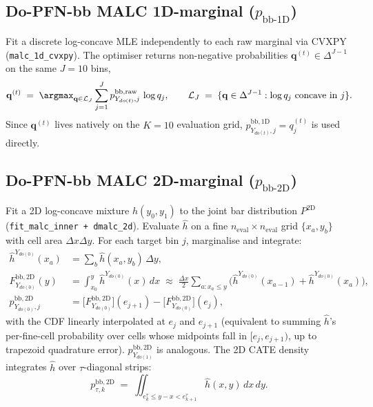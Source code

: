 \subsection{Do-PFN-bb MALC 1D-marginal ($p_{\text{bb-1D}}$)}
\label{app:bb1d}
Fit a discrete log-concave MLE independently to each raw marginal via
CVXPY (\texttt{malc\_1d\_cvxpy}).  The optimiser returns non-negative
probabilities $\mathbf{q}^{(t)} \in \Delta^{J-1}$ on the same $J = 10$
bins,
\[
\mathbf{q}^{(t)} \;=\; \argmax_{\mathbf{q} \in \mathcal{L}_J}
\sum_{j=1}^{J} p^{\mathrm{bb,raw}}_{Y_{do(t)}, j}\, \log q_j,
\qquad
\mathcal{L}_J \;=\; \{\mathbf{q} \in \Delta^{J-1} : \log q_j\ \text{concave in }j\}.
\]
Since $\mathbf{q}^{(t)}$ lives natively on the $K = 10$ evaluation grid,
$p^{\mathrm{bb,1D}}_{Y_{do(t)}, j} = q^{(t)}_j$ is used directly.

\subsection{Do-PFN-bb MALC 2D-marginal ($p_{\text{bb-2D}}$)}
\label{app:bb2d}
Fit a 2D log-concave mixture $\widehat{h}(y_0, y_1)$ to the joint bar
distribution $P^{\mathrm{2D}}$ (\texttt{fit\_malc\_inner + dmalc\_2d}).
Evaluate $\widehat{h}$ on a fine $n_{\text{eval}} \times n_{\text{eval}}$
grid $\{x_a, y_b\}$ with cell area $\Delta x \Delta y$.  For each target
bin $j$, marginalise and integrate:
\begin{align}
\widehat{h}^{Y_{do(0)}}(x_a) &= \sum_b \widehat{h}(x_a, y_b)\, \Delta y, \\
\label{eq:bb2d-cdf}
F^{\mathrm{bb,2D}}_{Y_{do(0)}}(y) &= \int_{x_0}^{y} \widehat{h}^{Y_{do(0)}}(x)\, dx
   \;\approx\; \frac{\Delta x}{2}\sum_{a: x_a \le y}
       \bigl(\widehat{h}^{Y_{do(0)}}(x_{a-1}) + \widehat{h}^{Y_{do(0)}}(x_a)\bigr), \\
p^{\mathrm{bb,2D}}_{Y_{do(0)}, j} &=
   \bigl[F^{\mathrm{bb,2D}}_{Y_{do(0)}}\bigr]\!(e_{j+1})
   - \bigl[F^{\mathrm{bb,2D}}_{Y_{do(0)}}\bigr]\!(e_{j}),
\end{align}
with the CDF linearly interpolated at $e_j$ and $e_{j+1}$
(equivalent to summing $\widehat{h}$'s per-fine-cell probability over
cells whose midpoints fall in $[e_j, e_{j+1})$, up to trapezoid quadrature
error).  $p^{\mathrm{bb,2D}}_{Y_{do(1)}}$ is analogous.  The 2D CATE
density integrates $\widehat{h}$ over $\tau$-diagonal strips:
\begin{equation}
p^{\mathrm{bb,2D}}_{\tau, k} \;=\; \iint_{e^\tau_k \le y - x < e^\tau_{k+1}}
   \widehat{h}(x, y)\, dx\, dy.
\end{equation}

